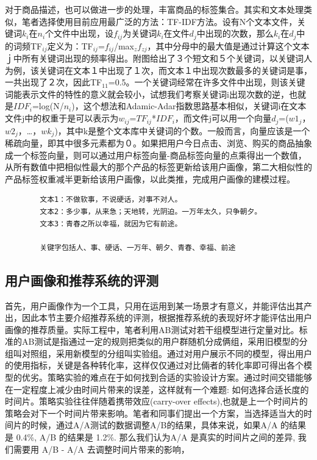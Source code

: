 		对于商品描述，也可以做进一步的处理，丰富商品的标签集合。其实和文本处理类似，笔者选择使用目前应用最广泛的方法：TF-IDF方法。设有N个文本文件，关键词$k_{i}$在$n_{i}$个文件中出现，设$f_{ij}$为关键词$k_i$在文件$d_j$中出现的次数，那么$k_i$在$d_j$中的词频TF$_{ij}$定义为：TF$_{ij}$=$f_{ij}$/max$_zf_{zj}$，其中分母中的最大值是通过计算这个文本ｊ中所有关键词出现的频率得出。附图给出了３个短文和５个关键词，以关键词人为例，该关键词在文本１中出现了１次，而文本１中出现次数最多的关键词是事，一共出现了２次，因此TF$_{11}$=0.5。一个关键词经常在许多文件中出现，则该关键词能表示文件的特性的意义就会较小，试想我们考察关键词i出现次数的逆，也就是$IDF_{i}$=log(N/$n_{i}$)，这个想法和Adamic-Adar指数思路基本相似，关键词i在文本文件j中的权重于是可以表示为$w_{ij}$=$TF_{ij}$*$IDF_{i}$，而文件j可以用一个向量$d_{j}$=($w1_{j}$，$w2_{j}$，…，$wk_{j}$)，其中k是整个文本库中关键词的个数。一般而言，向量应该是一个稀疏向量，即其中很多元素都为０。如果把用户今日点击、浏览、购买的商品抽象成一个标签向量，则可以通过用户标签向量-商品标签向量的点乘得出一个数值，从所有数值中把相似性最大的那个产品的标签更新给该用户画像，第二大相似性的产品标签权重减半更新给该用户画像，以此类推，完成用户画像的建模过程。
		\begin{lstlisting}
		文本1：不做软事，不说硬话，对事不对人。
		文本2：多少事，从来急；天地转，光阴迫。一万年太久，只争朝夕。
		文本3：青春之所以幸福，就因为它有前途。

		关键字包括人、事、硬话、一万年、朝夕、青春、幸福、前途
		\end{lstlisting}

		\subsection{用户画像和推荐系统的评测}
		首先，用户画像作为一个工具，只用在运用到某一场景才有意义，并能评估出其产出，因此本节主要介绍推荐系统的评测，根据推荐系统的表现好坏才能评估出用户画像的推荐质量。实际工程中，笔者利用AB测试对若干组模型进行定量对比。标准的AB测试是指通过一定的规则把类似的用户群随机分成俩组，采用旧模型的分组叫对照组，采用新模型的分组叫实验组。通过对用户展示不同的模型，得出用户的使用指标，关键是各种转化率，这样仅仅通过对比倆者的转化率即可得出各个模型的优劣。策略实验的难点在于如何找到合适的实验设计方案。通过时间交错能够在一定程度上减少由时间片带来的误差，这样就有一个难题:  如何选择合适长度的时间片。策略实验往往伴随着携带效应(carry-over effects),也就是上一个时间片的策略会对下一个时间片带来影响。笔者和同事们提出一个方案，当选择适当大的时间片的时候，通过A/A测试的数据调整A/B的结果，具体来说，如果A/A 的结果是 0.4\%, A/B 的结果是 1.2\%. 那么我们认为A/A  是真实的时间片之间的差异, 我们需要用 A/B - A/A 去调整时间片带来的影响，

